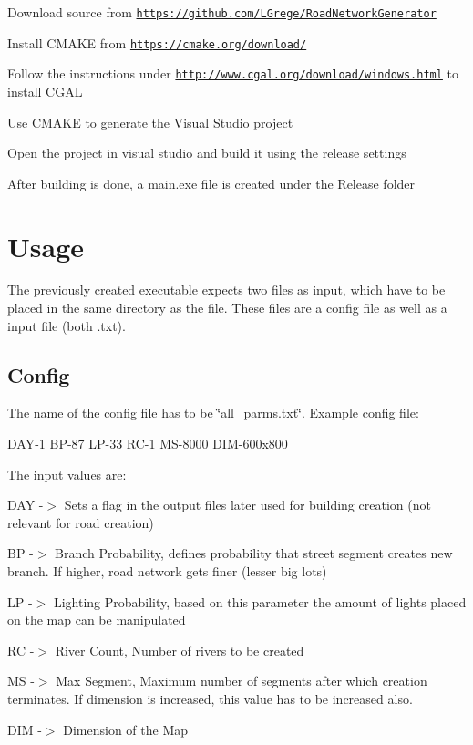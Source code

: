 \begin{DoxyItemize}
\item Download source from \href{https://github.com/LGrege/RoadNetworkGenerator}{\tt https\+://github.\+com/\+L\+Grege/\+Road\+Network\+Generator}
\item Install C\+M\+A\+KE from \href{https://cmake.org/download/}{\tt https\+://cmake.\+org/download/}
\item Follow the instructions under \href{http://www.cgal.org/download/windows.html}{\tt http\+://www.\+cgal.\+org/download/windows.\+html} to install C\+G\+AL
\item Use C\+M\+A\+KE to generate the Visual Studio project ~\newline
 
\item Open the project in visual studio and build it using the release settings ~\newline
 
\item After building is done, a main.\+exe file is created under the Release folder
\end{DoxyItemize}\hypertarget{index_usage_sec}{}\section{Usage}\label{index_usage_sec}
The previously created executable expects two files as input, which have to be placed in the same directory as the file. These files are a config file as well as a input file (both .txt).\hypertarget{index_config_file}{}\subsection{Config}\label{index_config_file}
The name of the config file has to be \char`\"{}all\+\_\+parms.\+txt\char`\"{}. Example config file\+:


\begin{DoxyCode}
DAY-1
BP-87
LP-33
RC-1
MS-8000
DIM-600x800
\end{DoxyCode}


The input values are\+:
\begin{DoxyItemize}
\item D\+AY -\/$>$ Sets a flag in the output files later used for building creation (not relevant for road creation)
\item BP -\/$>$ Branch Probability, defines probability that street segment creates new branch. If higher, road network gets finer (lesser big lots)
\item LP -\/$>$ Lighting Probability, based on this parameter the amount of lights placed on the map can be manipulated
\item RC -\/$>$ River Count, Number of rivers to be created
\item MS -\/$>$ Max Segment, Maximum number of segments after which creation terminates. If dimension is increased, this value has to be increased also.
\item D\+IM -\/$>$ Dimension of the Map
\end{DoxyItemize}

